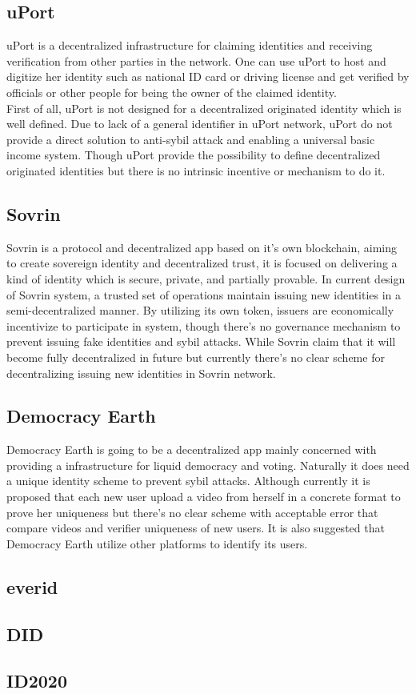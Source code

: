 \documentclass{article}
\begin{document}
\subsection{uPort}

uPort is a decentralized infrastructure for claiming identities and receiving verification from other parties in the network. One can use uPort to host and digitize her identity such as national ID card or driving license and get verified by officials or other people for being the owner of the claimed identity.\\
 First of all, uPort is not designed for a decentralized originated identity which is well defined. Due to lack of a general identifier in uPort network, uPort do not provide a direct solution to anti-sybil attack and enabling a universal basic income system. Though uPort provide the possibility to define decentralized originated identities but there is no intrinsic incentive or mechanism to do it.

\subsection{Sovrin}

Sovrin is a protocol and decentralized app based on it’s own blockchain, aiming to create sovereign identity and decentralized trust, it is focused on delivering a kind of identity which is secure, private, and partially provable. In current design of Sovrin system, a trusted set of operations maintain issuing new identities in a semi-decentralized manner. By utilizing its own token, issuers are economically incentivize to participate in system, though there’s no governance mechanism to prevent issuing fake identities and sybil attacks. While Sovrin claim that it will become fully decentralized in future but currently there’s no clear scheme for decentralizing issuing new identities in Sovrin network. 

\subsection{Democracy Earth}
Democracy Earth is going to be a decentralized app mainly concerned with providing a infrastructure for liquid democracy and voting. Naturally it does need a unique identity scheme to prevent sybil attacks. Although currently it is proposed that each new user upload a video from herself in a concrete format to prove her uniqueness but there’s no clear scheme with acceptable error that compare videos and verifier uniqueness of new users. It is also suggested that Democracy Earth utilize other platforms to identify its users.
\subsection{everid}
\subsection{ DID}
\subsection{ID2020}
\end{document}
